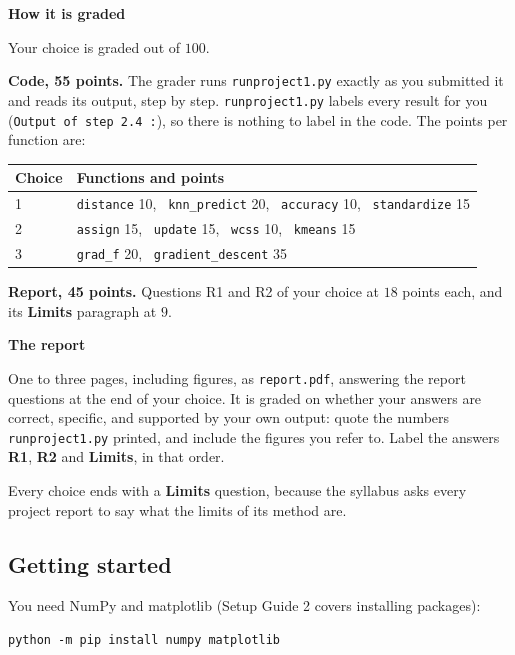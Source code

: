 \documentclass[11pt]{article}
\theoremstyle{definition}
\newenvironment{callout}[1]
  {\par\medskip\needspace{5\baselineskip}%
   \begin{lrbox}{\qcbox}%
   \begin{minipage}{\dimexpr\textwidth-2\fboxsep-4pt}%
   \setlength{\parskip}{0.4em}%
   \textbf{\sffamily\color{RoyalBlue}#1}\par}
  {\end{minipage}\end{lrbox}%
   \begin{center}\colorbox{softbg}{\usebox{\qcbox}}\end{center}\medskip}
\newcommand{\file}[1]{\texttt{#1}}
\begin{document}
\begin{callout}{How it is graded}
Your choice is graded out of $100$.

\textbf{Code, 55 points.} The grader runs \file{runproject1.py} exactly as you
submitted it and reads its output, step by step. \file{runproject1.py} labels every result
for you (\texttt{Output of step 2.4 :}), so there is nothing to label in the
code. The points per function are:

\begin{center}
\renewcommand{\arraystretch}{1.2}
\begin{tabular}{@{}l l@{}}
\toprule
\textbf{Choice} & \textbf{Functions and points} \\
\midrule
1 & \texttt{distance} 10, \ \texttt{knn\_predict} 20, \ \texttt{accuracy} 10,
    \ \texttt{standardize} 15 \\
2 & \texttt{assign} 15, \ \texttt{update} 15, \ \texttt{wcss} 10, \
    \texttt{kmeans} 15 \\
3 & \texttt{grad\_f} 20, \ \texttt{gradient\_descent} 35 \\
\bottomrule
\end{tabular}
\end{center}

\textbf{Report, 45 points.} Questions R1 and R2 of your choice at $18$ points
each, and its \textbf{Limits} paragraph at $9$.
\end{callout}

\begin{callout}{The report}
One to three pages, including figures, as \file{report.pdf}, answering the
report questions at the end of your choice. It is graded on whether your answers
are correct, specific, and supported by your own output: quote the numbers
\file{runproject1.py} printed, and include the figures you refer to. Label the answers
\textbf{R1}, \textbf{R2} and \textbf{Limits}, in that order.

Every choice ends with a \textbf{Limits} question, because the syllabus asks
every project report to say what the limits of its method are.
\end{callout}

\subsection*{Getting started}

You need NumPy and matplotlib (Setup Guide 2 covers installing packages):
\begin{lstlisting}[language={}]
python -m pip install numpy matplotlib
\end{lstlisting}
\end{document}

